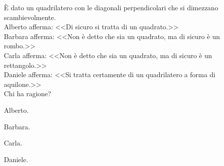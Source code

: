 \begin{esercizio}
\label{ese:4.68}
\`E dato un quadrilatero con le diagonali perpendicolari che si dimezzano scambievolmente.\\
Alberto afferma: <<Di sicuro si tratta di un quadrato.>>\\
Barbara afferma: <<Non è detto che sia un quadrato, ma di sicuro è un rombo.>>\\
Carla afferma: <<Non è detto che sia un quadrato, ma di sicuro è un rettangolo.>>\\
Daniele afferma: <<Si tratta certamente di un quadrilatero a forma di aquilone.>>\\
Chi ha ragione?
\begin{multicols}{4}
\begin{enumeratea}
\item Alberto.
\item Barbara.
\item Carla.
\item Daniele.
\end{enumeratea}
\end{multicols}
\end{esercizio}
